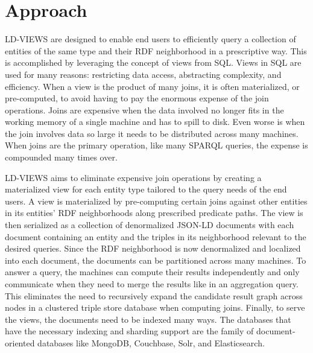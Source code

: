 \section{Approach}
\label{sec:approach}



LD-VIEWS are designed to enable end users to efficiently query a collection of entities of the same type and their RDF neighborhood in a prescriptive way.   
This is accomplished by leveraging the concept of views from SQL.  
Views in SQL are used for many reasons: restricting data access, abstracting complexity, and efficiency. 
When a view is the product of many joins, it is often materialized, or pre-computed, to avoid having to pay the enormous expense of the join operations.  
Joins are expensive when the data involved no longer fits in the working memory of a single machine and has to spill to disk.  
Even worse is when the join involves data so large it needs to be distributed across many machines.  
When joins are the primary operation, like many SPARQL queries, the expense is compounded many times over.

LD-VIEWS aims to eliminate expensive join operations by creating a materialized view for each entity type tailored to the query needs of the end users.  
A view is materialized by pre-computing certain joins against other entities in its entities' RDF neighborhoods along prescribed predicate paths.  
The view is then serialized as a collection of denormalized JSON-LD documents with each document containing an entity and the triples in its neighborhood relevant to the desired queries.  
Since the RDF neighborhood is now denormalized and localized into each document, the documents can be partitioned across many machines.
To answer a query, the machines can compute their results independently and only communicate when they need to merge the results like in an aggregation query.
This eliminates the need to recursively expand the candidate result graph across nodes in a clustered triple store database when computing joins.  
Finally, to serve the views, the documents need to be indexed many ways.
The databases that have the necessary indexing and sharding support are the family of document-oriented databases like MongoDB, Couchbase, Solr, and Elasticsearch.  

